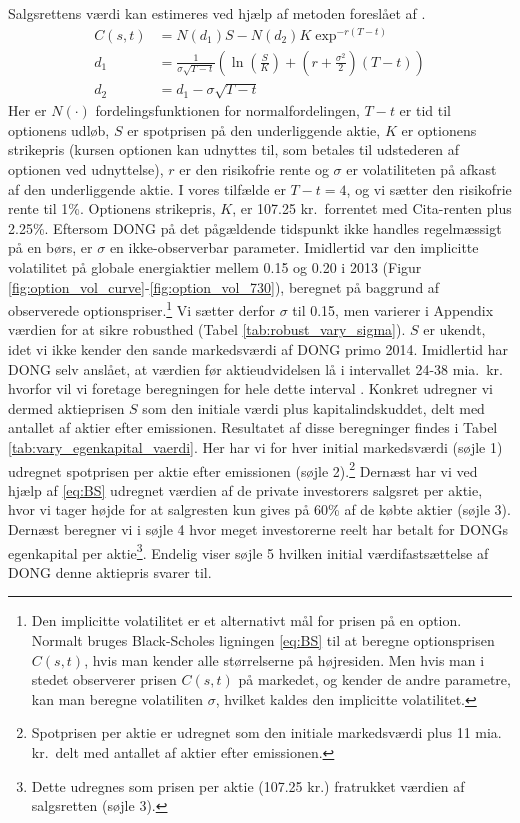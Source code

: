\documentclass{article}
\begin{document}
Salgsrettens værdi kan estimeres ved hjælp af metoden foreslået af \cite{Black1973}. 
\begin{align}
C(s,t)&=N(d_1)S-N(d_2)K \exp^{-r(T-t)} \label{eq:BS}\\
d_1&= \frac{1}{\sigma\sqrt{T-t}}\left( \ln\left( \frac{S}{K} \right)+\left(r+\frac{\sigma^2}{2} \right)(T-t) \right) \nonumber \\
d_2&=d_1-\sigma \sqrt{T-t} \nonumber
\end{align}
Her er $N(\cdot)$ fordelingsfunktionen for normalfordelingen, $T-t$ er tid til optionens udløb, $S$ er spotprisen på den underliggende aktie, $K$ er optionens strikepris (kursen optionen kan udnyttes til, som betales til udstederen af optionen ved udnyttelse), $r$ er den risikofrie rente og $\sigma$ er volatiliteten på afkast af den underliggende aktie. I vores tilfælde er $T-t=4$, og vi sætter den risikofrie rente til 1\%. Optionens strikepris, $K$, er 107.25 kr.\ forrentet med Cita-renten plus 2.25\%. Eftersom DONG på det pågældende tidspunkt ikke handles regelmæssigt på en børs, er $\sigma$ en ikke-observerbar parameter. Imidlertid var den implicitte volatilitet på globale energiaktier mellem 0.15 og 0.20 i 2013 (Figur \ref{fig:option_vol_curve}-\ref{fig:option_vol_730}), beregnet på baggrund af observerede optionspriser.\footnote{Den implicitte volatilitet er et alternativt mål for prisen på en option. Normalt bruges Black-Scholes ligningen \eqref{eq:BS} til at beregne optionsprisen $C(s, t)$, hvis man kender alle størrelserne på højresiden. Men hvis man i stedet observerer prisen $C(s, t)$ på markedet, og kender de andre parametre, kan man beregne volatiliten $\sigma$, hvilket kaldes den implicitte volatilitet.}
Vi sætter derfor $\sigma$ til 0.15, men varierer i Appendix værdien for at sikre robusthed (Tabel \ref{tab:robust_vary_sigma}). $S$ er ukendt, idet vi ikke kender den sande markedsværdi af DONG primo 2014. Imidlertid har DONG selv anslået, at værdien før aktieudvidelsen lå i intervallet 24-38 mia.\ kr.\, hvorfor vil vi foretage beregningen for hele dette interval \citep{DONG2015b}. Konkret udregner vi dermed aktieprisen $S$ som den initiale værdi plus kapitalindskuddet, delt med antallet af aktier efter emissionen. 
Resultatet af disse beregninger findes i Tabel \ref{tab:vary_egenkapital_vaerdi}. Her har vi for hver initial markedsværdi (søjle 1) udregnet spotprisen per aktie efter emissionen (søjle 2).\footnote{Spotprisen per aktie er udregnet som den initiale markedsværdi plus 11 mia. kr.\ delt med antallet af aktier efter emissionen.} Dernæst har vi ved hjælp af \eqref{eq:BS} udregnet værdien af de private investorers salgsret per aktie, hvor vi tager højde for at salgresten kun gives på 60\% af de købte aktier (søjle 3). Dernæst  beregner vi i søjle 4 hvor meget investorerne reelt har betalt for DONGs egenkapital per aktie\footnote{Dette udregnes som prisen per aktie (107.25 kr.) fratrukket værdien af salgsretten (søjle 3).}. Endelig viser søjle 5 hvilken initial værdifastsættelse af DONG denne aktiepris svarer til. 
 
\end{document}
